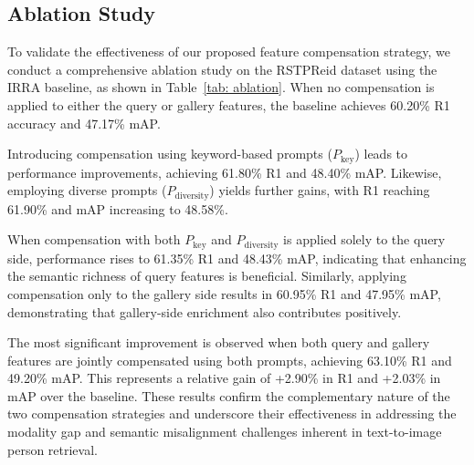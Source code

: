 \subsection{Ablation Study}

To validate the effectiveness of our proposed feature compensation strategy, we conduct a comprehensive ablation study on the RSTPReid dataset using the IRRA baseline, as shown in Table~\ref{tab: ablation}. When no compensation is applied to either the query or gallery features, the baseline achieves 60.20\% R1 accuracy and 47.17\% mAP.

Introducing compensation using keyword-based prompts ($P_{\text{key}}$) leads to performance improvements, achieving 61.80\% R1 and 48.40\% mAP. Likewise, employing diverse prompts ($P_{\text{diversity}}$) yields further gains, with R1 reaching 61.90\% and mAP increasing to 48.58\%.

When compensation with both $P_{\text{key}}$ and $P_{\text{diversity}}$ is applied solely to the query side, performance rises to 61.35\% R1 and 48.43\% mAP, indicating that enhancing the semantic richness of query features is beneficial. Similarly, applying compensation only to the gallery side results in 60.95\% R1 and 47.95\% mAP, demonstrating that gallery-side enrichment also contributes positively.

The most significant improvement is observed when both query and gallery features are jointly compensated using both prompts, achieving 63.10\% R1 and 49.20\% mAP. This represents a relative gain of +2.90\% in R1 and +2.03\% in mAP over the baseline. These results confirm the complementary nature of the two compensation strategies and underscore their effectiveness in addressing the modality gap and semantic misalignment challenges inherent in text-to-image person retrieval.


